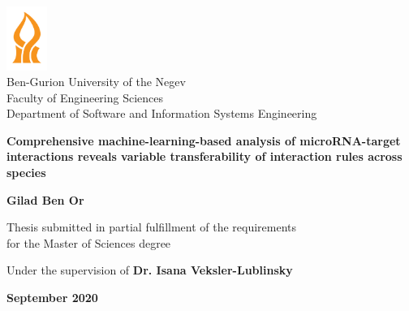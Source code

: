 \begin{titlepage}
    \begin{center}
        \vspace*{1cm}
        
        \includegraphics[width=0.1\textwidth]{bgu}\\
        Ben-Gurion University of the Negev\\
        Faculty of Engineering Sciences\\
        Department of Software and Information Systems Engineering
        
        \vspace{2cm}
        
        {\Large \textbf{Comprehensive machine-learning-based analysis of microRNA-target interactions reveals variable transferability of interaction rules across species}}
        
        \vspace{1.5cm}
        
        \textbf{Gilad Ben Or}
        
        \vspace{1cm}
        
        Thesis submitted in partial fulfillment of the requirements\\for the Master of Sciences degree
        
        \vspace{1cm}
        
        Under the supervision of \textbf{Dr. Isana Veksler-Lublinsky}
        
        \vfill
        
        \textbf{September 2020}
    \end{center}
\end{titlepage}